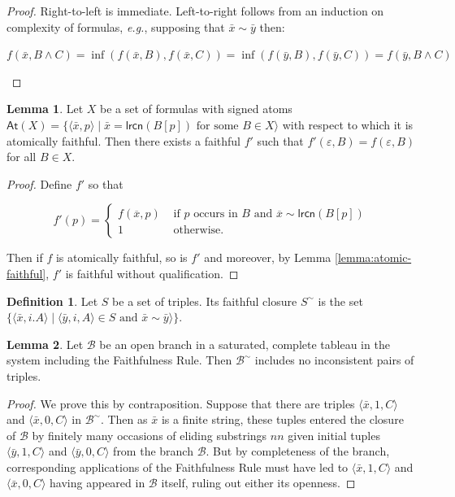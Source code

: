 \documentclass{amsart}
\theoremstyle{definition}
\newtheorem{lemma}{Lemma}
\newtheorem{mdef}{Definition}
\newcommand{\lrcn}{\mathsf{lrcn}}
\begin{document}
\begin{proof}
    Right-to-left is immediate. Left-to-right follows from an induction on complexity of formulas, \emph{e.g.}, supposing that $\bar{x}\sim\bar{y}$ then:

    \begin{center}
        $f(\bar{x},B\wedge C)=\inf(f(\bar{x},B),f(\bar{x},C))=\inf(f(\bar{y},B),f(\bar{y},C))=f(\bar{y},B\wedge C)$
    \end{center}

    
\end{proof}

\begin{lemma}\label{lemma:find-a-faithful-counterexample}
    Let $X$ be a set of formulas with signed atoms $\mathsf{At}(X)=\lbrace \langle \bar{x},p\rangle\mid \bar{x}=\lrcn(B[p])\mbox{ for some }B\in X\rangle$ with respect to which it is atomically faithful. Then there exists a faithful $f'$ such that $f'(\varepsilon,B)=f(\varepsilon,B)$ for all $B\in X$.
\end{lemma}

\begin{proof}
    Define $f'$ so that 


    \[
f'(p)=\left\{
        \begin{array}{rl}
            f(\overline{x},p) & \text{ if } p \text{ occurs in $B$ and $\overline{x}\sim\lrcn(B[p])$} \\
            1 & \text{ otherwise}.
        \end{array}\right.
\]

Then if $f$ is atomically faithful, so is $f'$ and moreover, by Lemma \ref{lemma:atomic-faithful}, $f'$ is faithful without qualification.
\end{proof}

\begin{mdef}
    Let $S$ be a set of triples. Its faithful closure $S^{\sim}$ is the set $\lbrace\langle\bar{x},i.A\rangle\mid\langle\bar{y},i,A\rangle\in S\mbox{ and }\bar{x}\sim\bar{y}\rangle\rbrace$.
\end{mdef}

\begin{lemma}
    Let $\mathcal{B}$ be an open branch in a saturated, complete tableau in the system including the Faithfulness Rule. Then $\mathcal{B}^{\sim}$ includes no inconsistent pairs of triples.
\end{lemma}

\begin{proof}
We prove this by contraposition. Suppose that there are triples $\langle\bar{x},1,C\rangle$ and $\langle\bar{x},0,C\rangle$ in $\mathcal{B}^{\sim}$. Then as $\bar{x}$ is a finite string, these tuples entered the closure of $\mathcal{B}$ by finitely many occasions of eliding substrings $nn$ given initial tuples $\langle\bar{y},1,C\rangle$ and $\langle\bar{y},0,C\rangle$ from the branch $\mathcal{B}$. But  by completeness of the branch, corresponding applications of the Faithfulness Rule must have led to  $\langle\bar{x},1,C\rangle$ and $\langle\bar{x},0,C\rangle$ having appeared in $\mathcal{B}$ itself, ruling out either its openness.
\end{proof}
\end{document}

